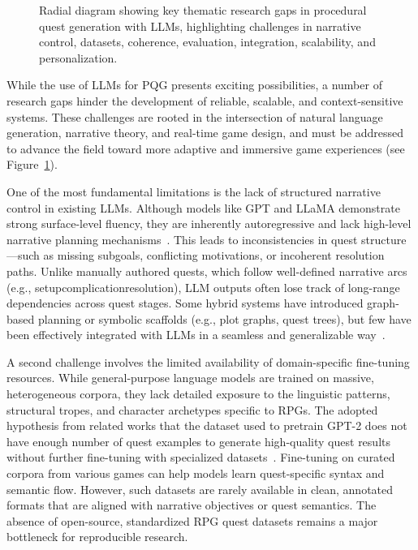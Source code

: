 \begin{figure}[t]
  \caption{Radial diagram showing key thematic research gaps in procedural quest generation with LLMs, highlighting challenges in narrative control, datasets, coherence, evaluation, integration, scalability, and personalization.}
  \label{fig:research-gaps}
\end{figure}

While the use of LLMs for PQG presents exciting possibilities, a number of research
gaps hinder the development of reliable, scalable, and context-sensitive systems. These
challenges are rooted in the intersection of natural language generation, narrative theory,
and real-time game design, and must be addressed to advance the field toward more
adaptive and immersive game experiences (see Figure~\ref{fig:research-gaps}).

One of the most fundamental limitations is the lack of structured narrative control in
existing LLMs. Although models like GPT and LLaMA demonstrate strong surface-level
fluency, they are inherently autoregressive and lack high-level narrative planning mechanisms~\cite{bommasani2021opportunities}.
This leads to inconsistencies in quest structure—such as missing subgoals,
conflicting motivations, or incoherent resolution paths. Unlike manually authored quests,
which follow well-defined narrative arcs (e.g., setup\textrightarrow complication\textrightarrow resolution), LLM outputs
often lose track of long-range dependencies across quest stages. Some hybrid systems
have introduced graph-based planning or symbolic scaffolds (e.g., plot graphs, quest
trees), but few have been effectively integrated with LLMs in a seamless and generalizable
way~\cite{ammanabrolu2019toward,ashby2023personalized}.

A second challenge involves the limited availability of domain-specific fine-tuning
resources. While general-purpose language models are trained on massive, heterogeneous
corpora, they lack detailed exposure to the linguistic patterns, structural tropes, and character
archetypes specific to RPGs. The adopted hypothesis from related works that the
dataset used to pretrain GPT-2 does not have enough number of quest examples to generate
high-quality quest results without further fine-tuning with specialized datasets~\cite{vartinen2022generating,van2021fine}.
Fine-tuning on curated corpora from various games can help models learn quest-specific
syntax and semantic flow. However, such datasets are rarely available in clean,
annotated formats that are aligned with narrative objectives or quest semantics. The
absence of open-source, standardized RPG quest datasets remains a major bottleneck for
reproducible research.

